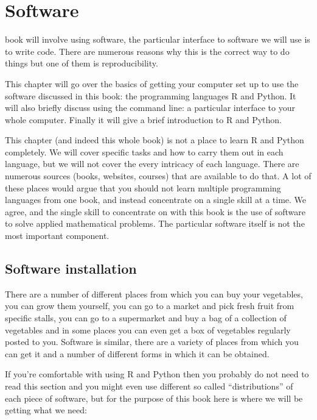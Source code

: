 \chapter[Software]{Software}

 book will involve using software, the particular
interface to software we will use is to write code. There are numerous reasons
why this is the correct way to do things but one of them is reproducibility. %

This chapter will go over the basics of getting your computer set up to use the
software discussed in this book: the programming languages R %
and Python. %
It will also briefly discuss using the command line: a particular interface to
your whole computer. Finally it will give a brief introduction to R and
Python.

This chapter (and indeed this whole book) is not a place to learn R and
Python completely. We will cover specific tasks and how to carry them out in each language,
but we will not cover the every intricacy of each language. There are
numerous sources (books, websites, courses) that are available to do that.
A lot of these places would argue that you should not learn multiple
programming languages from one book, and instead concentrate on a single skill at a
time. We agree, and the single skill to concentrate on with this book is the use
of software to solve applied mathematical problems. The particular software itself is not
the most important component.

\section{Software installation}\label{sec:software-installation}

There are a number of different places from which you can buy your vegetables,
you can grow them yourself, you can go to a market and pick fresh fruit from
specific stalls, you can go to a supermarket and buy a bag of a collection of
vegetables and in some places you can even get a box of vegetables regularly
posted to you. Software is similar, there are a variety of places from which you
can get it and a number of different forms in which it can be obtained.

If you're comfortable with using R and Python then you probably do not need to
read this section and you might even use different so called ``distributions''
of each piece of software, but for the purpose of this book here is where we will
be getting what we need:

